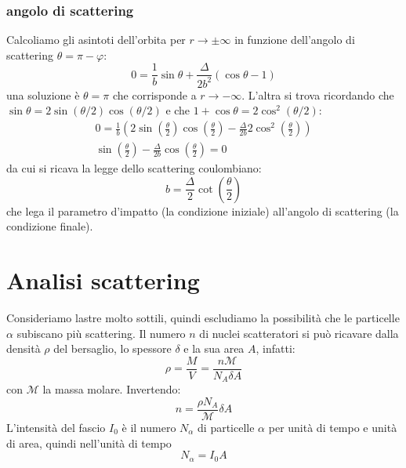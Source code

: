 \subsubsection{angolo di scattering}
Calcoliamo gli asintoti dell'orbita per $r\to\pm\infty$ in funzione dell'angolo di scattering $\theta=\pi-\varphi$:
\[
0=\frac{1}{b}\sin\theta+\frac{\Delta}{2b^2}\left(\cos\theta-1\right)
\]
una soluzione è $\theta = \pi$ che corrisponde a $r\to -\infty$. L'altra si trova ricordando che $\sin\theta=2\sin(\theta/2)\cos(\theta/2)$ e che $1+\cos\theta=2\cos^2(\theta/2)$:
\begin{gather*}
0=\frac{1}{b}\left(2\sin\left(\frac{\theta}{2}\right)\cos\left(\frac{\theta}{2}\right)-\frac{\Delta}{2b}2\cos^2\left(\frac{\theta}{2}\right)\right)\\
\sin\left(\frac{\theta}{2}\right)-\frac{\Delta}{2b}\cos\left(\frac{\theta}{2}\right)=0
\end{gather*}
da cui si ricava la legge dello scattering coulombiano:
\begin{equation}
b=\frac{\Delta}{2}\cot\left(\frac{\theta}{2}\right)
\end{equation}
che lega il parametro d'impatto (la condizione iniziale) all'angolo di scattering (la condizione finale).
\section{Analisi scattering}
Consideriamo lastre molto sottili, quindi escludiamo la possibilità che le particelle $\alpha$ subiscano più scattering. Il numero $n$ di nuclei scatteratori si può ricavare dalla densità $\rho$ del bersaglio, lo spessore $\delta$ e la sua area $A$, infatti:
\[
\rho=\frac{M}{V}=\frac{n\mathcal{M}}{N_A\delta A}
\]
con $\mathcal{M}$ la massa molare. Invertendo:
\begin{equation}
n=\frac{\rho N_A}{\mathcal{M}}\delta A
\end{equation}
L'intensità del fascio $I_0$ è il numero $N_\alpha$ di particelle $\alpha$ per unità di tempo e unità di area, quindi nell'unità di tempo
\begin{equation}
N_\alpha=I_0A
\end{equation}

